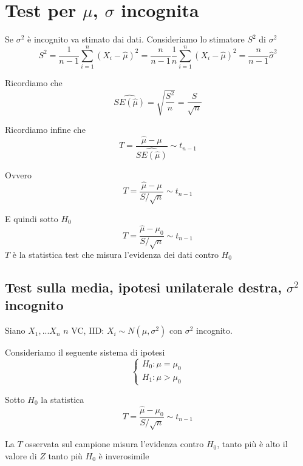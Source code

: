 \documentclass[
  11pt,
]{book}
\theoremstyle{mytheoremstyle}
\theoremstyle{mydefstyle}
\begin{document}
\section{\texorpdfstring{Test per \(\mu\), \(\sigma\) incognita}{Test per \textbackslash mu, \textbackslash sigma incognita}}\label{test-per-mu-sigma-incognita}

Se \(\sigma^2\) è incognito va stimato dai dati. Consideriamo lo stimatore
\(S^2\) di \(\sigma^2\)
\[S^2=\frac {1}{n-1}\sum_{i=1}^n (X_i-\hat \mu)^2=\frac {n}{n-1}\frac 1 n\sum_{i=1}^n (X_i-\hat \mu)^2=\frac n {n-1}\hat\sigma^2\]

Ricordiamo che
\[\widehat{SE(\hat\mu)}=\sqrt{\frac {S^2}n}=\frac S {\sqrt n}\]

Ricordiamo infine che
\[T=\frac{\hat \mu-\mu}{\widehat{SE(\hat\mu)}}\sim t_{n-1}\]

Ovvero \[T=\frac{\hat \mu-\mu}{S/\sqrt n}\sim t_{n-1}\]

E quindi sotto \(H_0\) \[T=\frac{\hat \mu-\mu_0}{S/\sqrt n}\sim t_{n-1}\]
\(T\) è la statistica test che misura l'evidenza dei dati contro \(H_0\)

\subsection{\texorpdfstring{Test sulla media, ipotesi unilaterale destra, \(\sigma^2\) incognito}{Test sulla media, ipotesi unilaterale destra, \textbackslash sigma\^{}2 incognito}}\label{test-sulla-media-ipotesi-unilaterale-destra-sigma2-incognito}

Siano \(X_1,...X_n\) \(n\) VC, IID: \(X_i\sim N(\mu,\sigma^2)\) con \(\sigma^2\)
incognito.

Consideriamo il seguente sistema di ipotesi \[\begin{cases}
H_0:\mu=\mu_0\\
H_1:\mu>\mu_0
\end{cases}\]

Sotto \(H_0\) la statistica
\[T=\frac{\hat \mu-\mu_0}{S/\sqrt n}\sim t_{n-1}\]

La \(T\) osservata sul campione misura l'evidenza contro \(H_0\), tanto più
è alto il valore di \(Z\) tanto più \(H_0\) è inverosimile
\end{document}
